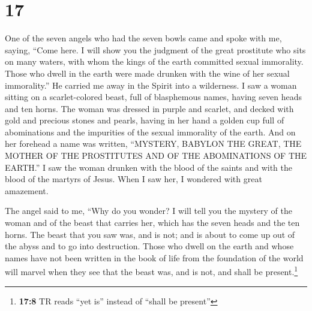 \hypertarget{section-16}{%
\section{17}\label{section-16}}

 One of the seven angels who had the seven bowls came and
spoke with me, saying, ``Come here. I will show you the judgment of the
great prostitute who sits on many waters,  with whom the
kings of the earth committed sexual immorality. Those who dwell in the
earth were made drunken with the wine of her sexual immorality.''
 He carried me away in the Spirit into a wilderness. I saw
a woman sitting on a scarlet-colored beast, full of blasphemous names,
having seven heads and ten horns.  The woman was dressed
in purple and scarlet, and decked with gold and precious stones and
pearls, having in her hand a golden cup full of abominations and the
impurities of the sexual immorality of the earth.  And on
her forehead a name was written, ``MYSTERY, BABYLON THE GREAT, THE
MOTHER OF THE PROSTITUTES AND OF THE ABOMINATIONS OF THE EARTH.''
 I saw the woman drunken with the blood of the saints and
with the blood of the martyrs of Jesus. When I saw her, I wondered with
great amazement.

 The angel said to me, ``Why do you wonder? I will tell
you the mystery of the woman and of the beast that carries her, which
has the seven heads and the ten horns.  The beast that you
saw was, and is not; and is about to come up out of the abyss and to go
into destruction. Those who dwell on the earth and whose names have not
been written in the book of life from the foundation of the world will
marvel when they see that the beast was, and is not, and shall be
present.\footnote{\textbf{17:8} TR reads ``yet is'' instead of ``shall
  be present''}

